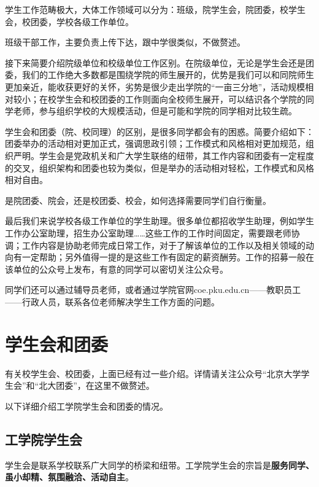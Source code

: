 \documentclass[11pt,oneside]{book}
\begin{document}
学生工作范畴极大，大体工作领域可以分为：班级，院学生会，院团委，校学生会，校团委，学校各级工作单位。

班级干部工作，主要负责上传下达，跟中学很类似，不做赘述。

接下来简要介绍院级单位和校级单位工作区别。在院级单位，无论是学生会还是团委，我们的工作绝大多数都是围绕学院的师生展开的，优势是我们可以和同院师生更加亲近，能收获更好的关怀，劣势是很少走出学院的“一亩三分地”，活动规模相对较小；在校学生会和校团委的工作则面向全校师生展开，可以结识各个学院的同学老师，参与组织学校的大规模活动，但是可能和学院的同学相对比较生疏。

学生会和团委（院、校同理）的区别，是很多同学都会有的困惑。简要介绍如下：团委举办的活动相对更加正式，强调思政引领；工作模式和风格相对更加规范，组织严明。学生会是党政机关和广大学生联络的纽带，其工作内容和团委有一定程度的交叉，组织架构和团委也较为类似，但是举办的活动相对轻松，工作模式和风格相对自由。

是院团委、院会，还是校团委、校会，如何选择需要同学们自行衡量。

最后我们来说学校各级工作单位的学生助理。很多单位都招收学生助理，例如学生工作办公室助理，招生办公室助理……这些工作的工作时间固定，需要跟老师协调；工作内容是协助老师完成日常工作，对于了解该单位的工作以及相关领域的动向有一定帮助；另外值得一提的是这些工作有固定的薪资酬劳。工作的招募一般在该单位的公众号上发布，有意的同学可以密切关注公众号。

同学们还可以通过辅导员老师，或者通过学院官网coe.pku.edu.cn——教职员工——行政人员，联系各位老师解决学生工作方面的问题。

\newpage

    \section{学生会和团委}
有关校学生会、校团委，上面已经有过一些介绍。详情请关注公众号“北京大学学生会”和“北大团委”，在这里不做赘述。

以下详细介绍工学院学生会和团委的情况。


\subsection{工学院学生会}
学生会是联系学校联系广大同学的桥梁和纽带。工学院学生会的宗旨是\textbf{服务同学、虽小却精、氛围融洽、活动自主}。
\end{document}
